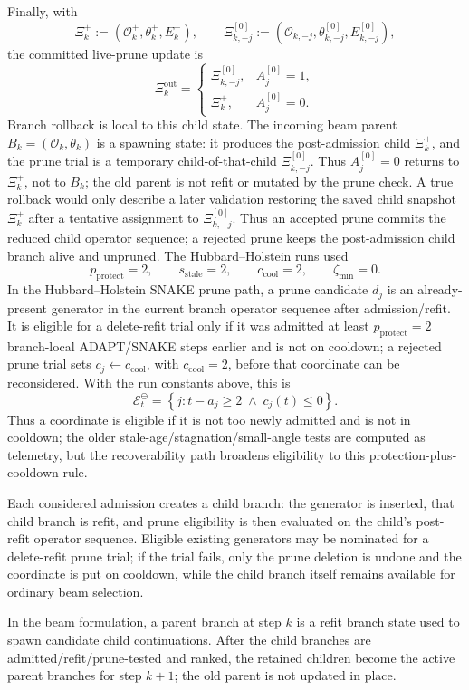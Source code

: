 \documentclass[
  reprint,
  amsmath,
  amssymb,
  aps,
  pra,
  nofootinbib,
  superscriptaddress,
  floatfix
]{revtex4-2}
\begin{document}
Finally, with
\[
\Xi_k^+:=(\mathcal O_k^+,\theta_k^+,E_k^+),
\qquad
\Xi_{k,-j}^{[0]}
:=
(\mathcal O_{k,-j},\theta_{k,-j}^{[0]},E_{k,-j}^{[0]}),
\]
the committed live-prune update is
\[
\Xi_k^{\mathrm{out}}
=
\begin{cases}
\Xi_{k,-j}^{[0]}, & A_j^{[0]}=1,\\
\Xi_k^+, & A_j^{[0]}=0.
\end{cases}
\]
Branch rollback is local to this child state.  The incoming beam parent
\(B_k=(\mathcal O_k,\theta_k)\) is a spawning state: it produces the
post-admission child \(\Xi_k^+\), and the prune trial is a temporary
child-of-that-child \(\Xi_{k,-j}^{[0]}\).  Thus \(A_j^{[0]}=0\) returns to
\(\Xi_k^+\), not to \(B_k\); the old parent is not refit or mutated by the
prune check.  A true rollback would only describe a later validation restoring
the saved child snapshot \(\Xi_k^+\) after a tentative assignment to
\(\Xi_{k,-j}^{[0]}\).  Thus an accepted prune commits the reduced child
operator sequence; a rejected prune keeps the post-admission child branch alive
and unpruned.
The Hubbard--Holstein runs used
\[
p_{\mathrm{protect}}=2,\qquad
s_{\mathrm{stale}}=2,\qquad
c_{\mathrm{cool}}=2,\qquad
\zeta_{\min}=0 .
\]
In the Hubbard--Holstein SNAKE prune path, a prune candidate \(d_j\) is an already-present generator in the current branch operator sequence after admission/refit.  It is eligible for a delete-refit trial only if it was admitted at least \(p_{\mathrm{protect}}=2\) branch-local ADAPT/SNAKE steps earlier and is not on cooldown; a rejected prune trial sets \(c_j\leftarrow c_{\mathrm{cool}}\), with \(c_{\mathrm{cool}}=2\), before that coordinate can be reconsidered.  With the run constants above, this is
\[
\mathcal E_t^{\ominus}
=
\left\{
j:
t-a_j\ge 2
\;\land\;
c_j(t)\le 0
\right\}.
\]
Thus a coordinate is eligible if it is not too newly admitted and is not in cooldown; the older stale-age/stagnation/small-angle tests are computed as telemetry, but the recoverability path broadens eligibility to this protection-plus-cooldown rule.

Each considered admission creates a child branch: the generator is inserted, that child branch is refit, and prune eligibility is then evaluated on the child's post-refit operator sequence.  Eligible existing generators may be nominated for a delete-refit prune trial; if the trial fails, only the prune deletion is undone and the coordinate is put on cooldown, while the child branch itself remains available for ordinary beam selection.

In the beam formulation, a parent branch at step \(k\) is a refit branch state used to spawn candidate child continuations.  After the child branches are admitted/refit/prune-tested and ranked, the retained children become the active parent branches for step \(k+1\); the old parent is not updated in place.
\end{document}
